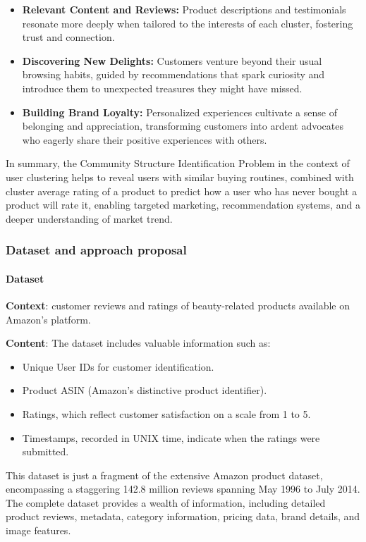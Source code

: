 \begin{itemize}
    \item\textbf{Relevant Content and Reviews: }Product descriptions and testimonials resonate more deeply when tailored to the interests of each cluster, fostering trust and connection.
    \item\textbf{Discovering New Delights:} Customers venture beyond their usual browsing habits, guided by recommendations that spark curiosity and introduce them to unexpected treasures they might have missed.
    \item\textbf{Building Brand Loyalty:} Personalized experiences cultivate a sense of belonging and appreciation, transforming customers into ardent advocates who eagerly share their positive experiences with others.
\end{itemize}
In summary, the Community Structure Identification Problem in the context of user clustering helps to reveal users with similar buying routines, combined with cluster average rating of a product to predict how a user who has never bought a product will rate it, enabling targeted marketing, recommendation systems, and a deeper understanding of market trend.

\subsubsection{Dataset and approach proposal}
\paragraph{Dataset}
\textbf{Context}: customer reviews and ratings of beauty-related products available on Amazon's platform.

\textbf{Content}: The dataset includes valuable information such as:
\begin{itemize}
    \item Unique User IDs for customer identification.
    \item Product ASIN (Amazon's distinctive product identifier).
    \item Ratings, which reflect customer satisfaction on a scale from 1 to 5.
    \item Timestamps, recorded in UNIX time, indicate when the ratings were submitted.
\end{itemize}
This dataset is just a fragment of the extensive Amazon product dataset, encompassing a staggering 142.8 million reviews spanning May 1996 to July 2014. 
The complete dataset provides a wealth of information, including detailed product reviews, metadata, category information, pricing data, brand details, and image features.
